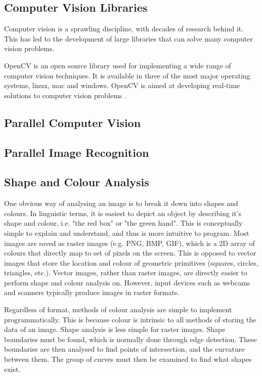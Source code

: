 \documentclass[../main.tex]{subfiles}
\begin{document}
    \subsection{Computer Vision Libraries}
      Computer vision is a sprawling discipline, with decades of research behind it.
      This has led to the development of large libraries that can solve many computer vision problems.
      
      OpenCV is an open source library used for implementing a wide range of computer vision techniques. 
      It is available in three of the most major operating systems, linux, mac and windows.
      OpenCV is aimed at developing real-time solutions to computer vision problems \cite{learningopencv}.

    \subsection{Parallel Computer Vision}
    \subsection{Parallel Image Recognition} %
    \subsection{Shape and Colour Analysis}
    One obvious way of analysing an image is to break it down into shapes and colours.
    In linguistic terms, it is easiest to depict an object by describing it's shape and colour, i.e. "the red box" or "the green hand".
    This is conceptually simple to explain and understand, and thus is more intuitive to program.
    Most images are saved as raster images (e.g. PNG, BMP, GIF), which is a 2D array of colours that directly map to set of pixels on the screen.
    This is opposed to vector images that store the location and colour of geometric primitives (squares, circles, triangles, etc.).
    Vector images, rather than raster images, are directly easier to perform shape and colour analysis on.
    However, input devices such as webcams and scanners typically produce images in raster formats.

    Regardless of format, methods of colour analysis are simple to implement programmatically.
    This is because colour is intrinsic to all methods of storing the data of an image.
    Shape analysis is less simple for raster images.
    Shape boundaries must be found, which is normally done through edge detection.
    These boundaries are then analysed to find points of intersection, and the curvature between them.
    The group of curves must then be examined to find what shapes exist.
\end{document}

